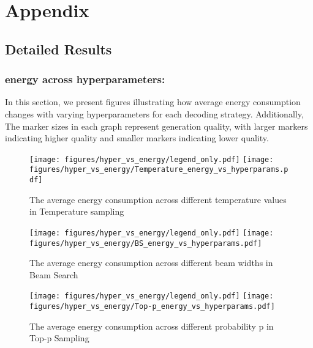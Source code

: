 \twocolumn
\section{Appendix}
\label{appendix}


\subsection{Detailed Results} 


\subsubsection{energy across hyperparameters:}
\label{appendix:hyper-energy}

In this section, we present figures illustrating how average energy consumption changes with varying hyperparameters for each decoding strategy. Additionally, The marker sizes in each graph represent generation quality, with larger markers indicating higher quality and smaller markers indicating lower quality.



\begin{figure}[h]
    \vskip 0.2in
    \centering
    \texttt{[image: figures/hyper\_vs\_energy/legend\_only.pdf]}
    \texttt{[image: figures/hyper\_vs\_energy/Temperature\_energy\_vs\_hyperparams.pdf]}
    \caption{The average energy consumption across different temperature values in Temperature sampling}
    \label{appendix:fig-temperature}
    \vskip 0.2in
\end{figure}


\begin{figure}[h]
    \centering
    \texttt{[image: figures/hyper\_vs\_energy/legend\_only.pdf]}
    \texttt{[image: figures/hyper\_vs\_energy/BS\_energy\_vs\_hyperparams.pdf]}
    \caption{The average energy consumption across different beam widths in Beam Search}
    \label{appendix:fig-beam}
\end{figure}


\begin{figure}[h]
    \centering
    \texttt{[image: figures/hyper\_vs\_energy/legend\_only.pdf]}
    \texttt{[image: figures/hyper\_vs\_energy/Top-p\_energy\_vs\_hyperparams.pdf]}
    \caption{The average energy consumption across different probability p in Top-p Sampling}
    \label{appendix:fig-topp}
\end{figure}

